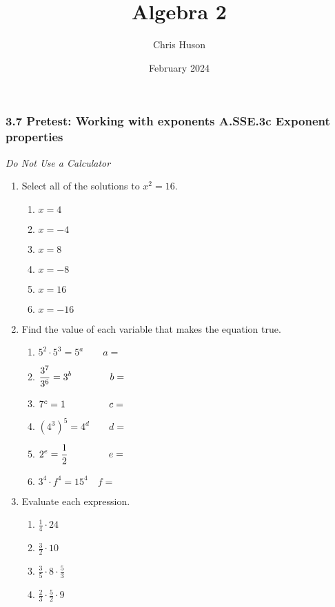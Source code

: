 \documentclass[12pt, twoside]{article}
\title{Algebra 2}
\author{Chris Huson}
\date{February 2024}
\begin{document}
\subsubsection*{3.7 Pretest: Working with exponents \hfill A.SSE.3c Exponent properties}
\emph{Do Not Use a Calculator}
\begin{enumerate}
\item Select all of the solutions to $x^2=16$.
    \begin{multicols}{2}
    \begin{enumerate}
        \item $x=4$
        \item $x=-4$
        \item $x=8$
        \item $x=-8$
        \item $x=16$
        \item $x=-16$
    \end{enumerate}
    \end{multicols}

    \item Find the value of each variable that makes the equation true.
    \begin{multicols}{2}
    \begin{enumerate}[itemsep=0.5cm]
        \item $5^2 \cdot 5^3 = 5^a \qquad a=$
        \item $\displaystyle \frac{3^7}{3^6} = 3^b \hspace{1.4cm}  b=$
        \item $7^c=1 \hspace{1.6cm} c=$
        \item $(4^3)^5 = 4^d \qquad d=$
        \item $\displaystyle 2^e = \frac{1}{2} \hspace{1.5cm}  e=$
        \item $3^4 \cdot f^4 = 15^4 \quad f=$
    \end{enumerate}
    \end{multicols} \vspace{0.5cm}

\item Evaluate each expression.
    \begin{multicols}{2}
    \begin{enumerate}[itemsep=0.5cm]
        \item $\displaystyle \frac{1}{4} \cdot 24$
        \item $\displaystyle \frac{3}{2} \cdot 10$
        \item $\displaystyle \frac{3}{5} \cdot 8 \cdot \frac{5}{3}$
        \item $\displaystyle \frac{2}{3} \cdot \frac{5}{2} \cdot 9$
    \end{enumerate}
    \end{multicols} \vspace{0.5cm}


\end{enumerate}
\end{document}
